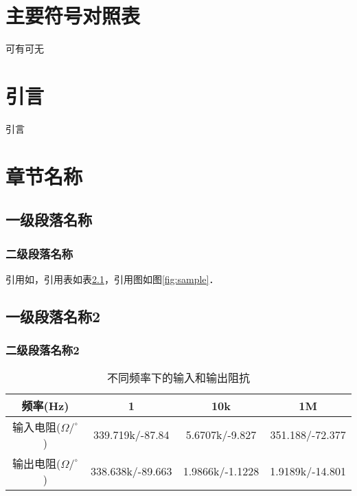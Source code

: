 \documentclass[UTF8,openany,AutoFakeBold,AutoFakeSlant,cs4size]{ctexbook}
\newcommand{\upcite}[1]{\textsuperscript{\cite{#1}}} %
\begin{document}
\chapter*{主要符号对照表}
可有可无
\clearpage

\normalsize
\linespread{1.5}\selectfont
{
	\fancyhf{}
	\fancyhead[CO]{\leftmark}
	\fancyfoot[CO,CE]{~\thepage~}
	\renewcommand{\headrulewidth}{0.7pt}
	\renewcommand{\footrulewidth}{0pt}
}
\fancyhf{}
\fancyhead[CO]{\leftmark}
\fancyfoot[CO,CE]{~\thepage~}
\renewcommand{\headrulewidth}{0.7pt}
\renewcommand{\footrulewidth}{0pt}

\setcounter{page}{1}

\chapter{引言}
引言

\chapter{章节名称}
\section{一级段落名称}
\subsection{二级段落名称}
引用如\upcite{lin2020cppm}，引用表如表\ref{tab:input_output_r}，引用图如图\ref{fig:sample}．


\section{一级段落名称2}
\subsection{二级段落名称2}

\begin{table}[h]
\small %
\centering
\caption{不同频率下的输入和输出阻抗}
\label{tab:input_output_r}
\begin{tabular}{cccc} %
\toprule %
频率(Hz) & 1 & 10k & 1M \\
\midrule
输入电阻($\Omega/^\circ$) & 339.719k/-87.84 & 5.6707k/-9.827 & 351.188/-72.377\\
输出电阻($\Omega/^\circ$) & 338.638k/-89.663 & 1.9866k/-1.1228 & 1.9189k/-14.801 \\
\bottomrule
\end{tabular}
\end{table}
\end{document}
